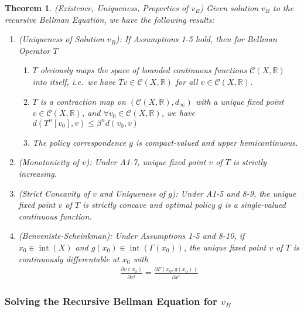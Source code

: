 \documentclass[12pt]{book}
\numberwithin{equation}{section} %
\theoremstyle{plain}
\newtheorem{thm}{Theorem}[section]
\theoremstyle{definition}
\theoremstyle{remark}
\newcommand{\sC}{\mathscr{C}}
\newcommand{\R}{\mathbb{R}}
\newcommand{\interior}{\operatorname{int}}
\begin{document}
\begin{thm}(Existence, Uniqueness, Properties of $v_B$)
Given solution $v_B$ to the recursive Bellman Equation,
we have the following results:
\begin{enumerate}
  \item
    \emph{(Uniqueness of Solution $v_B$)}:
    If Assumptions 1-5 hold, then for Bellman Operator $T$
    \begin{enumerate}[label=\emph{(\alph*)}]
      \item $T$ obviously maps the space of bounded continuous functions
        $\sC(X,\R)$ into itself, i.e.\ we have
        $Tv \in \sC(X,\R)$ for all $v\in\sC(X,\R)$.
      \item
        $T$ is a contraction map on $(\sC(X,\R),d_\infty)$ with a unique
        fixed point $v \in\sC(X,\R)$, and
        $\forall v_0 \in \sC(X,\R)$, we have
        $d(T^n[v_0],v) \leq \beta^n d(v_0,v)$
      \item
        The policy correspondence $g$ is compact-valued and upper
        hemicontinuous.
    \end{enumerate}

  \item
    \emph{(Monotonicity of $v$)}:
    Under A1-7, unique fixed point $v$ of $T$ is strictly increasing.

  \item
    \emph{(Strict Concavity of $v$ and Uniqueness of $g$)}:
    Under A1-5 and 8-9, the unique fixed point $v$ of $T$ is
    strictly concave and optimal policy $g$ is a single-valued
    continuous function.

  \item
    \emph{(Benveniste-Scheinkman)}:
    Under Assumptions 1-5 and 8-10, if $x_0\in \interior(X)$ and
    $g(x_0)\in\interior(\Gamma(x_0))$, the unique fixed point $v$
    of $T$ is continuously differentable at $x_0$ with
    \begin{align*}
      \frac{\partial v(x_0)}{\partial x^i}
      =
      \frac{\partial F(x_0, g(x_0))}{\partial x^i}
    \end{align*}
\end{enumerate}
\end{thm}



\clearpage
\subsubsection{Solving the Recursive Bellman Equation for $v_B$}
\end{document}
